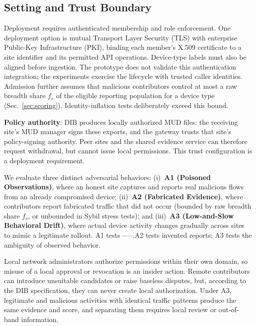 \documentclass[journal]{IEEEtran}
\theoremstyle{definition}
\begin{document}
\subsection{Setting and Trust Boundary}
\label{subsec:trust}
Deployment requires authenticated membership and role enforcement. One deployment option is mutual Transport Layer Security (TLS) with enterprise Public-Key Infrastructure (PKI), binding each member's X.509 certificate to a site identifier and its permitted API operations. Device-type labels must also be aligned before ingestion. The prototype does not validate this authentication integration; the experiments exercise the lifecycle with trusted caller identities. Admission further assumes that malicious contributors control at most a raw breadth share $f_s$ of the eligible reporting population for a device type (Sec.~\ref{sec:scoring}). Identity-inflation tests deliberately exceed this bound.

\textbf{Policy authority}: DIB produces locally authorized MUD files: the receiving site's MUD manager signs these exports, and the gateway trusts that site's policy-signing authority. Peer sites and the shared evidence service can therefore request withdrawal, but cannot issue local permissions. This trust configuration is a deployment requirement. 

We evaluate three distinct adversarial behaviors: (i)~\textbf{A1 (Poisoned Observations)}, where an honest site captures and reports real malicious flows from an already compromised device; (ii)~\textbf{A2 (Fabricated Evidence)}, where contributors report fabricated traffic that did not occur (bounded by raw breadth share $f_s$, or unbounded in Sybil stress tests); and (iii)~\textbf{A3 (Low-and-Slow Behavioral Drift)}, where actual device activity changes gradually across sites to mimic a legitimate rollout. A1 tests -----.A2 tests invented reports; A3 tests the ambiguity of observed behavior.

Local network administrators authorize permissions within their own domain, so misuse of a local approval or revocation is an insider action. Remote contributors can introduce unsuitable candidates or raise baseless disputes, but, according to the DIB specification, they can never create local authorization. Under A3, legitimate and malicious activities with identical traffic patterns produce the same evidence and score, and separating them requires local review or out-of-band information.
\end{document}
